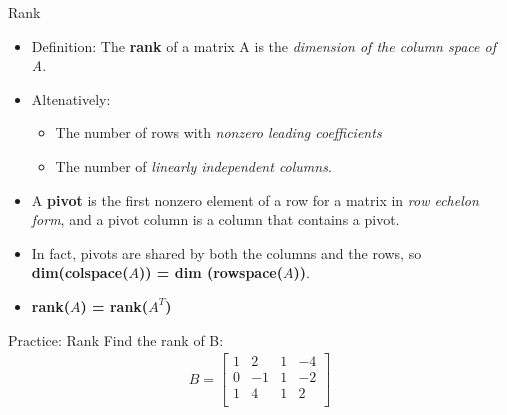\begin{frame}{Rank}
    \begin{itemize}
        \item Definition: The \textbf{rank} of a matrix A is the \textit{dimension of the column space of A}.
        \item Altenatively:
        \begin{itemize}
            \item The number of rows with \textit{nonzero leading coefficients}
            \item The number of \textit{linearly independent columns}.
        \end{itemize}
        \item A \textbf{pivot} is the first nonzero element of a row for a matrix in \textit{row echelon form}, and a pivot column is a column that contains a pivot.
        \item In fact, pivots are shared by both the columns and the rows, so \textbf{dim(colspace($A$)) = dim (rowspace($A$))}.
        \item \textbf{rank($A$) = rank($A^T$)}
    \end{itemize}
\end{frame}

\begin{frame}{Practice: Rank}
    Find the rank of B:
    \begin{align*}
        B = \begin{bmatrix}
            1 & 2 & 1 & -4 \\
            0 & -1 & 1 & -2 \\
            1 &  4 & 1 & 2 \\
        \end{bmatrix}
    \end{align*}
\end{frame}

